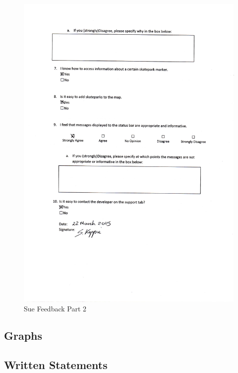 \begin{figure}[H]
    \includegraphics[width=\textwidth]{./Evaluation/images/SueFeedback2.pdf}
    \caption{Sue Feedback Part 2} \label{fig:SueFeedback2}
\end{figure}



\subsection{Graphs}

\subsection{Written Statements}
